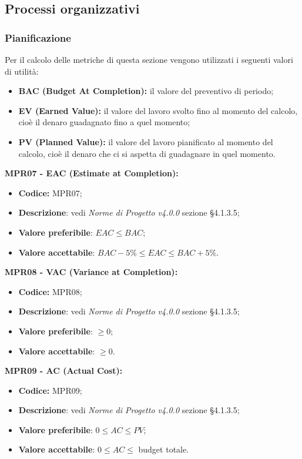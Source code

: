 \subsection{Processi organizzativi}
\subsubsection{Pianificazione}
Per il calcolo delle metriche di questa sezione vengono utilizzati i seguenti valori di utilità:
\begin{itemize}
    \item \textbf{BAC (Budget At Completion):} il valore del preventivo di periodo;
    \item \textbf{EV (Earned Value):}  il valore del lavoro svolto fino al momento del calcolo, cioè il denaro guadagnato fino a quel momento;
    \item \textbf{PV (Planned Value):} il valore del lavoro pianificato al momento del calcolo, cioè il denaro che ci si aspetta di guadagnare in quel momento.
\end{itemize}
\textbf{MPR07 - EAC (Estimate at Completion):}
\begin{itemize}
    \item \textbf{Codice:} MPR07;
    \item \textbf{Descrizione}: vedi \textit{Norme di Progetto v4.0.0} sezione \S 4.1.3.5;
    \item \textbf{Valore preferibile}: $EAC \leq BAC$;
    \item \textbf{Valore accettabile}: $BAC -5\% \leq EAC \leq BAC +5\%.$
\end{itemize}
\textbf{MPR08 - VAC (Variance at Completion):}
\begin{itemize}
    \item \textbf{Codice:} MPR08;
    \item \textbf{Descrizione}: vedi \textit{Norme di Progetto v4.0.0} sezione \S 4.1.3.5;
    \item \textbf{Valore preferibile}: $\geq 0$;
    \item \textbf{Valore accettabile}: $\geq 0$.
\end{itemize}
\textbf{MPR09 - AC (Actual Cost):}
\begin{itemize}
    \item \textbf{Codice:} MPR09;
    \item \textbf{Descrizione}: vedi \textit{Norme di Progetto v4.0.0} sezione \S4.1.3.5;
    \item \textbf{Valore preferibile}: $0 \leq AC \leq PV$;
    \item \textbf{Valore accettabile}: $0 \leq AC \leq$ budget totale.
\end{itemize}
